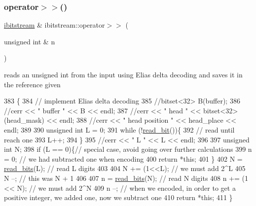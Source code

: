 \subsubsection{\texorpdfstring{operator$>$$>$()}{operator>>()}\hspace{0.1cm}{\footnotesize\ttfamily [1/2]}}
{\footnotesize\ttfamily \hyperlink{classibitstream}{ibitstream} \& ibitstream\+::operator$>$$>$ (\begin{DoxyParamCaption}\item[{unsigned int \&}]{n }\end{DoxyParamCaption})}



reads an unsigned int from the input using Elias delta decoding and saves it in the reference given 


\begin{DoxyCode}
383                                                    \{
384   \textcolor{comment}{// implement Elias delta decoding}
385   \textcolor{comment}{//bitset<32> B(buffer);}
386   \textcolor{comment}{//cerr << " buffer " << B << endl;}
387   \textcolor{comment}{//cerr << " head " << bitset<32>(head\_mask) << endl;}
388   \textcolor{comment}{//cerr << " head position " << head\_place << endl;}
389   
390   \textcolor{keywordtype}{unsigned} \textcolor{keywordtype}{int} L = 0;
391   \textcolor{keywordflow}{while} (!\hyperlink{classibitstream_a895239acf7179f6778388c39c97643e4}{read\_bit}())\{
392     \textcolor{comment}{// read until reach one}
393     L++;
394   \}
395   \textcolor{comment}{//cerr << " L " << L << endl;}
396   
397   \textcolor{keywordtype}{unsigned} \textcolor{keywordtype}{int} N;
398   \textcolor{keywordflow}{if} (L == 0)\{\textcolor{comment}{// special case, avoid going over further calculations}
399     n = 0; \textcolor{comment}{// we had subtracted one when encoding }
400     \textcolor{keywordflow}{return} *\textcolor{keyword}{this};
401   \}
402   N = \hyperlink{classibitstream_a2fdcaecf10fefa6942dcd5286a2696e0}{read\_bits}(L); \textcolor{comment}{// read L digits}
403   
404   N += (1<<L); \textcolor{comment}{// we must add 2^L}
405   N --; \textcolor{comment}{// this was N + 1}
406   
407   n = \hyperlink{classibitstream_a2fdcaecf10fefa6942dcd5286a2696e0}{read\_bits}(N); \textcolor{comment}{// read N digits}
408   n += (1 << N); \textcolor{comment}{// we must add 2^N}
409   n --; \textcolor{comment}{// when we encoded, in order to get a positive integer, we added one, now we subtract one}
410   \textcolor{keywordflow}{return} *\textcolor{keyword}{this};
411 \}
\end{DoxyCode}
\mbox{\label{classibitstream_a0264d01fa1211c4bb73f5de2bc68adbc}} 
